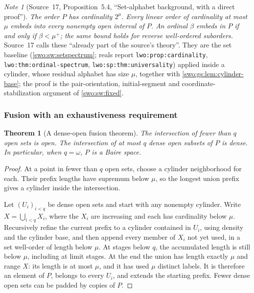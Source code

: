 \documentclass[11pt]{article}
\newtheorem{theorem}{Theorem}[section]
\theoremstyle{definition}
\theoremstyle{remark}
\newtheorem{note}[note]{Note}
\newcommand{\code}[1]{\texttt{\small #1}}
\begin{document}
\begin{note}[Source~17, Proposition~5.4, ``Set-alphabet background, with a direct proof'']\label{swo:gs:prop:local-universality}
\emph{The order $P$ has cardinality $2^\mu$. Every linear order of cardinality
at most $\mu$ embeds into every nonempty open interval of $P$. An ordinal
$\beta$ embeds in $P$ if and only if $\beta<\mu^+$; the same bound holds for
reverse well-ordered suborders.} Source~17 calls these ``already part of the
source's theory''. They are the set baseline (\cref{swo:sw:setspectrum};
reals report \code{lwo:prop:cardinality}, \code{lwo:thm:ordinal-spectrum},
\code{lwo:sp:thm:universality}) applied inside a cylinder, whose residual
alphabet has size $\mu$, together with \cref{swo:gs:lem:cylinder-base}; the
proof is the pair-orientation, initial-segment and coordinate-stabilization
argument of \cref{swo:sw:fixed}.
\end{note}

\subsubsection{Fusion with an exhaustiveness requirement}
\begin{theorem}[A dense-open fusion theorem]\label{swo:gs:thm:fusion}
The intersection of fewer than $q$ open sets is open. The intersection of
at most $q$ dense open subsets of $P$ is dense. In particular, when
$q=\omega$, $P$ is a Baire space.
\end{theorem}
\begin{proof}
At a point in fewer than $q$ open sets, choose a cylinder neighborhood for
each. Their prefix lengths have supremum below $\mu$, so the longest
union prefix gives a cylinder inside the intersection.

Let $(U_i)_{i<q}$ be dense open sets and start with any nonempty cylinder.
Write $X=\bigcup_{i<q}X_i$, where the $X_i$ are increasing and each has
cardinality below $\mu$. Recursively refine the current prefix to a
cylinder contained in $U_i$, using density and the cylinder base, and then
append every member of $X_i$ not yet used, in a set well-order of length
below $\mu$. At stages below $q$, the accumulated length is still below
$\mu$, including at limit stages. At the end the union has length exactly
$\mu$ and range $X$: its length is at most $\mu$, and it has used $\mu$
distinct labels. It is therefore an element of $P$, belongs to every
$U_i$, and extends the starting prefix. Fewer dense open sets can be
padded by copies of $P$.
\end{proof}
\end{document}
